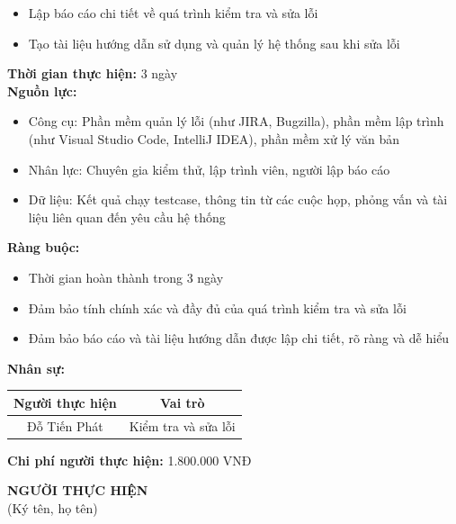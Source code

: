 {\begin{minipage}{\textwidth}
\begin{itemize}
        \item Lập báo cáo chi tiết về quá trình kiểm tra và sửa lỗi
        \item Tạo tài liệu hướng dẫn sử dụng và quản lý hệ thống sau khi sửa lỗi
    \end{itemize}
    \vspace{0.5cm}
    \noindent \textbf{Thời gian thực hiện:} 3 ngày \\
    \noindent \textbf{Nguồn lực:}
    \begin{itemize}
        \item Công cụ: Phần mềm quản lý lỗi (như JIRA, Bugzilla), phần mềm lập trình (như Visual Studio Code, IntelliJ IDEA), phần mềm xử lý văn bản
        \item Nhân lực: Chuyên gia kiểm thử, lập trình viên, người lập báo cáo
        \item Dữ liệu: Kết quả chạy testcase, thông tin từ các cuộc họp, phỏng vấn và tài liệu liên quan đến yêu cầu hệ thống
    \end{itemize}
    \vspace{0.5cm}
    \noindent \textbf{Ràng buộc:}
    \begin{itemize}
        \item Thời gian hoàn thành trong 3 ngày
        \item Đảm bảo tính chính xác và đầy đủ của quá trình kiểm tra và sửa lỗi
        \item Đảm bảo báo cáo và tài liệu hướng dẫn được lập chi tiết, rõ ràng và dễ hiểu
    \end{itemize}
    \vspace{0.5cm}
    \noindent \textbf{Nhân sự:}
    \begin{longtable}{|c|c|}
    \hline
    \textbf{Người thực hiện} & \textbf{Vai trò} \\
    \hline
    Đỗ Tiến Phát & Kiểm tra và sửa lỗi \\
    \hline
    \end{longtable}
    \vspace{0.5cm}
    \noindent \textbf{Chi phí người thực hiện:} 1.800.000 VNĐ \\
    \vspace{1cm}
    \begin{flushleft}
        \hspace{8cm} \textbf{NGƯỜI THỰC HIỆN} \\
        \hspace{8.8cm} (Ký tên, họ tên) \\
        \vspace{1cm}
    \end{flushleft}
    \end{minipage}
}
% 
